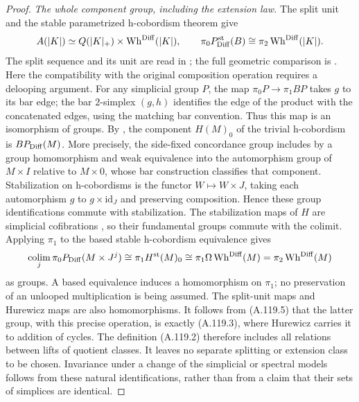 \begin{proof}
\emph{The whole component group, including the extension law.}
The split unit and the stable parametrized h-cobordism theorem give
\[
 A(|K|)\simeq Q(|K|_+)\times\operatorname{Wh}^{\rm Diff}(|K|),
 \qquad
 \pi_0P_{\rm Diff}^{\rm st}(B)
       \cong\pi_2\operatorname{Wh}^{\rm Diff}(|K|).
\]
The split sequence and its unit are read in
\cite[p.~247 and the basic diagram p.~248]{Jahren2010}; the full
geometric comparison is \cite[Theorem~0.1, p.~2; Definition~1.3.4
and (1.3.5), p.~18]{WaldhausenJahrenRognes2013}.
Here the compatibility with the original composition operation
requires a delooping argument. For any simplicial group $P$, the
map $\pi_0P\to\pi_1BP$ takes $g$ to its bar edge; the bar
$2$-simplex $(g,h)$ identifies the edge of the product with the
concatenated edges, using the matching bar convention. Thus this
map is an isomorphism of groups. By
\cite[Remark~1.1.11 and (1.1.12), p.~12]
{WaldhausenJahrenRognes2013}, the component $H(M)_0$ of the
trivial h-cobordism is $BP_{\rm Diff}(M)$. More precisely, the
side-fixed concordance group includes by a group homomorphism and
weak equivalence into the automorphism group of $M\times I$
relative to $M\times0$, whose bar construction classifies that
component. Stabilization on h-cobordisms is the functor
$W\mapsto W\times J$, taking each automorphism $g$ to
$g\times\mathrm{id}_J$ and preserving composition. Hence these
group identifications commute with stabilization. The stabilization
maps of $H$ are simplicial cofibrations
\cite[Definition~1.1.3, p.~8]{WaldhausenJahrenRognes2013}, so
their fundamental groups commute with the colimit. Applying
$\pi_1$ to the based stable h-cobordism equivalence gives
\[
 \operatorname*{colim}_j\pi_0P_{\rm Diff}(M\times J^j)
 \cong\pi_1H^{\rm st}(M)_0
 \cong\pi_1\Omega\operatorname{Wh}^{\rm Diff}(M)
 =\pi_2\operatorname{Wh}^{\rm Diff}(M)
\]
as groups. A based equivalence induces a homomorphism on
$\pi_1$; no preservation of an unlooped multiplication is being
assumed. The split-unit maps and Hurewicz maps are also
homomorphisms. It follows from (A.119.5) that the latter group,
with this precise operation, is exactly (A.119.3), where Hurewicz
carries it to addition of cycles.
The definition (A.119.2) therefore includes all relations between
lifts of quotient classes. It leaves no separate splitting or
extension class to be chosen. Invariance under a change of the
simplicial or spectral models follows from these natural
identifications, rather than from a claim that their sets of
simplices are identical.


\end{proof}

